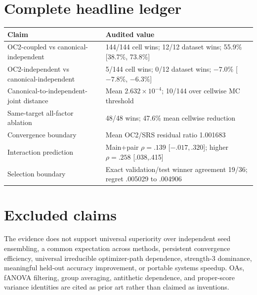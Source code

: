 \documentclass{article}
\begin{document}
\section{Complete headline ledger}

\begin{table}[h]
\centering
\small
\begin{tabular}{p{.48\linewidth}p{.40\linewidth}}
\toprule
Claim & Audited value \\
\midrule
OC2-coupled vs canonical-independent &
144/144 cell wins; 12/12 dataset wins; 55.9\% [38.7\%, 73.8\%] \\
OC2-independent vs canonical-independent &
5/144 cell wins; 0/12 dataset wins; $-7.0$\% [$-7.8$\%, $-6.3$\%] \\
Canonical-to-independent-joint distance &
Mean $2.632\times10^{-4}$; 10/144 over cellwise MC threshold \\
Same-target all-factor ablation &
48/48 wins; 47.6\% mean cellwise reduction \\
Convergence boundary &
Mean OC2/SRS residual ratio 1.001683 \\
Interaction prediction &
Main+pair $\rho=.139$ [$-.017,.320$]; higher $\rho=.258$ [.038,.415] \\
Selection boundary &
Exact validation/test winner agreement 19/36; regret .005029 to .004906 \\
\bottomrule
\end{tabular}
\end{table}

\section{Excluded claims}

The evidence does not support universal superiority over independent seed
ensembling, a common expectation across methods, persistent convergence
efficiency, universal irreducible optimizer-path dependence, strength-3
dominance, meaningful held-out accuracy improvement, or portable systems
speedup. OAs, fANOVA filtering, group averaging, antithetic dependence, and
proper-score variance identities are cited as prior art rather than claimed
as inventions.
\end{document}
